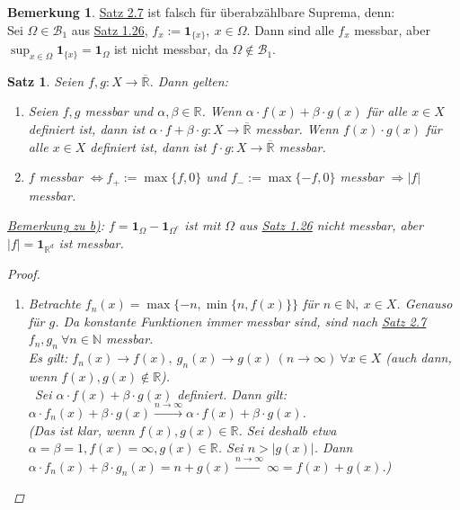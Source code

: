 \documentclass[a4paper]{scrreprt}
\newcommand{\doubleOne}{\textbf{1}}
\newcommand{\R}{\mathbb{R}}
\newcommand{\Rq}{\overline{\R}}
\newcommand{\N}{\mathbb{N}}
\newcommand{\Borel}{\mathcal{B}}
\newcommand{\jlabel}[1]{\label{j_#1}}
\newcommand{\jhyperref}[2]{\hyperref[j_#1]{#2}}
\newcommand{\jlink}[1]{\jhyperref{#1}{#1}}
\newcommand{\jabb}[3]{ #1: #2 \rightarrow #3 }
\theoremstyle{plain}
\newtheorem{satz}[thm]{Satz}
\theoremstyle{definition}
\newtheorem*{bem*}{Bemerkung}
\begin{document}
{{{\begin{bem*}
    \jlink{Satz 2.7} ist falsch für überabzählbare Suprema, denn:\\
    Sei $\Omega \in \Borel_1$ aus \jlink{Satz 1.26}, $f_x := \doubleOne_{\{x\}}, \ x \in \Omega$. Dann sind alle $f_x$ messbar, aber $\sup_{x\in\Omega} \doubleOne_{\{x\}} = \doubleOne_\Omega$ ist nicht messbar, da $\Omega \notin \Borel_1$.
\end{bem*}

\begin{satz}
\jlabel{Satz 2.8}
    Seien $\jabb{f,g}{X}{\Rq}$. Dann gelten:
    \begin{enumerate}
        \item 
            Seien $f,g$ messbar und $\alpha, \beta \in \R$. Wenn $\alpha\cdot f(x) + \beta\cdot g(x)$ für alle $x\in X$ definiert ist, dann ist $\jabb{\alpha\cdot f + \beta\cdot g}{X}{\Rq}$ messbar. Wenn $f(x)\cdot g(x)$ für alle $x\in X$ definiert ist, dann ist $\jabb{f\cdot g}{X}{\Rq}$ messbar.
        \item
            $f$ messbar $\Leftrightarrow f_+ := \max\{f,0\}$ und $f_- := \max\{-f,0\}$ messbar $\Rightarrow |f|$ messbar.
    \end{enumerate}
    \uline{Bemerkung zu b)}: $f = \doubleOne_\Omega - \doubleOne_{\Omega^c}$ ist mit $\Omega$ aus \jlink{Satz 1.26} nicht messbar, aber $|f| = \doubleOne_{\R^d}$ ist messbar.
    \begin{proof}
        \begin{enumerate}
            \item 
                Betrachte $f_n(x) = \max \{-n, \min\{n, f(x)\}\}$ für $n\in\N, \ x\in X$. Genauso für $g$. Da konstante Funktionen immer messbar sind, sind nach \jlink{Satz 2.7} $f_n, g_n \ \forall n\in\N$ messbar.\\
                Es gilt: $f_n(x) \rightarrow f(x), \ g_n(x) \rightarrow g(x) \ (n\rightarrow \infty) \ \forall x\in X$ (auch dann, wenn $f(x),g(x) \notin \R$).\\\
                Sei $\alpha\cdot f(x) + \beta \cdot g(x)$ definiert. Dann gilt:\\
                $\alpha\cdot f_n(x) + \beta\cdot g(x)\xrightarrow{n\rightarrow\infty} \alpha\cdot f(x) + \beta \cdot g(x)$.\\
                (Das ist klar, wenn $f(x), g(x) \in \R$. Sei deshalb etwa $\alpha=\beta=1, f(x)=\infty, g(x)\in\R$. Sei $n>|g(x)|$. Dann $\alpha\cdot f_n(x) + \beta\cdot g_n(x) = n + g(x) \xrightarrow{n\rightarrow \infty} \infty = f(x)+g(x)$.)\\

\end{enumerate}
\end{proof}
\end{satz}}}}
\end{document}
